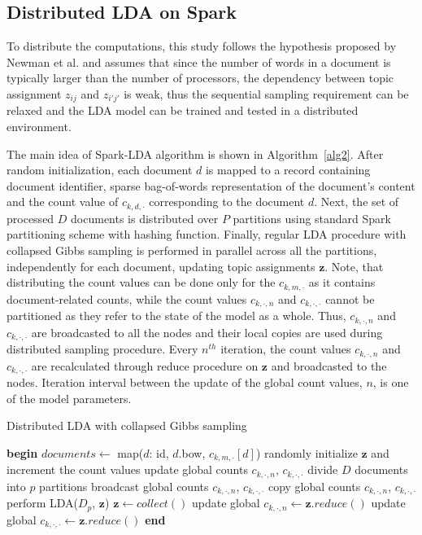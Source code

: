 \documentclass[journal]{IEEEtran}
\begin{document}
\subsection{Distributed LDA on Spark}
To distribute the computations, this study follows the hypothesis proposed by Newman et al.\cite{newman2009distributed} and assumes that since the number of words in a document is typically larger than the number of processors, the dependency between topic assignment $z_{ij}$ and $z_{i'j'}$ is weak, thus the sequential sampling requirement can be relaxed and the LDA model can be trained and tested in a distributed environment. 

The main idea of Spark-LDA algorithm is shown in Algorithm~\ref{alg2}. After random initialization, each document $d$ is mapped to a record containing document identifier, sparse bag-of-words representation of the document's content and the count value of $c_{k,d,\cdot}$ corresponding to the document $d$. Next, the set of processed $D$ documents is distributed over $P$ partitions using standard Spark partitioning scheme with hashing function. Finally, regular LDA procedure with collapsed Gibbs sampling is performed in parallel across all the partitions, independently for each document, updating topic assignments $\textbf{z}$.  Note, that distributing the count values can be done only for the $c_{k,m,\cdot}$ as it contains document-related counts, while the count values $c_{k,\cdot,n}$ and $c_{k,\cdot,\cdot}$ cannot be partitioned as they refer to the state of the model as a whole. Thus, $c_{k,\cdot,n}$ and $c_{k,\cdot,\cdot}$ are broadcasted to all the nodes and their local copies are used during distributed sampling procedure. Every $n^{th}$ iteration, the count values $c_{k,\cdot,n}$ and $c_{k,\cdot,\cdot}$ are recalculated through reduce procedure on $\textbf{z}$ and broadcasted to the nodes. Iteration interval between the update of the global count values, $n$, is one of the model parameters.


 \begin{algorithm}
\caption{Distributed LDA with collapsed Gibbs sampling}
\label{alg2}
\begin{algorithmic}
\scriptsize
\State \textbf{begin}
\State $documents \leftarrow $ map($d$: id, $d$.bow, $c_{k,m,\cdot}[d]$)
\State randomly initialize $\textbf{z}$ and increment the count values
\State update global counts $c_{k,\cdot,n}$, $c_{k,\cdot,\cdot}$
\State divide $D$ documents into $p$ partitions
   \State broadcast global counts $c_{k,\cdot,n}$, $c_{k,\cdot,\cdot}$
   	  \State copy global counts $c_{k,\cdot,n}$, $c_{k,\cdot,\cdot}$
   	  \State perform LDA($D_p$, $\textbf{z}$)
   \EndFor
   \State $\textbf{z} \leftarrow collect()$
   \State update global $c_{k,\cdot,n} \leftarrow\textbf{z}.reduce()$
   \State update global $c_{k,\cdot,\cdot} \leftarrow\textbf{z}.reduce()$
  \EndFor
\State \textbf{end}
\end{algorithmic}
\end{algorithm}
\end{document}
